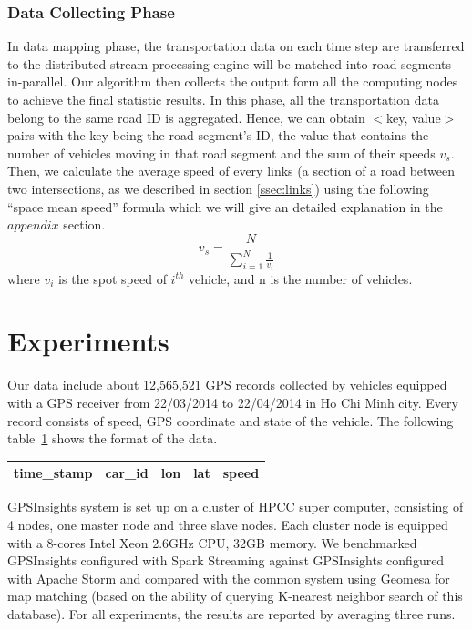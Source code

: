 \documentclass{acm_proc_article-sp}
\begin{document}
\subsubsection{Data Collecting Phase} \label{datacollectingphase} In data mapping phase, the transportation data on each time step are transferred to the distributed stream processing engine will be matched into road segments in-parallel. Our algorithm then collects the output form all the computing nodes to achieve the final statistic results.  In this phase, all the transportation data belong to the same road ID is aggregated. Hence, we can obtain $<$key, value$>$ pairs with the key being the road segment's ID, the value that contains the number of vehicles moving in that road segment and the sum of their speeds $v_{s}$. Then, we calculate the average speed of every links (a section of a road between two intersections, as we described in section \ref{ssec:links}) using the following ``space mean speed'' formula which we will give an detailed explanation in the $appendix$ section.
\[ v_{s} = \frac{N}{\sum_{i=1}^{N}\frac{1}{v_{i}}}\]
where $v_{i}$ is the spot speed of $i^{th}$ vehicle, and n is the number of vehicles.

\section{Experiments}

Our data include about 12,565,521 GPS records collected by vehicles equipped with a GPS receiver from 22/03/2014 to 22/04/2014 in Ho Chi Minh city. Every record consists of speed, GPS coordinate and state of the vehicle. The following table~\ref{table:location-data} shows the format of the data.

\begin{table}[h]
\centering
\begin{tabular}{|c|c|c|c|c|}
\hline
\textbf{time\_stamp} & \textbf{car\_id} & \textbf{lon}   & \textbf{lat} & \textbf{speed} \\ \hline
\end{tabular}
\label{table:location-data}
\end{table}


GPSInsights system is set up on a cluster of HPCC super computer, consisting of 4 nodes, one master node and three slave nodes. Each cluster node is equipped with a  8-cores Intel Xeon 2.6GHz CPU, 32GB memory. We benchmarked GPSInsights configured with Spark Streaming against GPSInsights configured with Apache Storm and compared with the common system using Geomesa for map matching (based on the ability of querying K-nearest neighbor search of this database). For all experiments, the results are reported by averaging three runs. 
	
\end{document}
